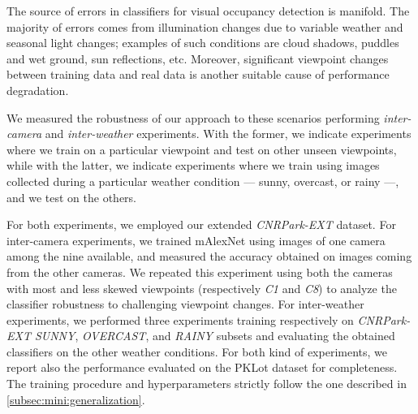 The source of errors in classifiers for visual occupancy detection is manifold.
The majority of errors comes from illumination changes due to variable weather and seasonal light changes;
examples of such conditions are cloud shadows, puddles and wet ground, sun reflections, etc.
Moreover, significant viewpoint changes between training data and real data is another suitable cause of performance degradation.

We measured the robustness of our approach to these scenarios performing \emph{inter-camera} and \emph{inter-weather} experiments.
With the former, we indicate experiments where we train on a particular viewpoint and test on other unseen viewpoints, while with the latter, we indicate experiments where we train using images collected during a particular weather condition --- sunny, overcast, or rainy ---, and we test on the others.

For both experiments, we employed our extended \emph{CNRPark-EXT} dataset.
For inter-camera experiments, we trained mAlexNet using images of one camera among the nine available, and measured the accuracy obtained on images coming from the other cameras.
We repeated this experiment using both the cameras with most and less skewed viewpoints (respectively \emph{C1} and \emph{C8}) to analyze the classifier robustness to challenging viewpoint changes.
For inter-weather experiments, we performed three experiments training respectively on \emph{CNRPark-EXT SUNNY}, \emph{OVERCAST}, and \emph{RAINY} subsets and evaluating the obtained classifiers on the other weather conditions.
For both kind of experiments, we report also the performance evaluated on the PKLot dataset for completeness.
The training procedure and hyperparameters strictly follow the one described in \ref{subsec:mini:generalization}.

